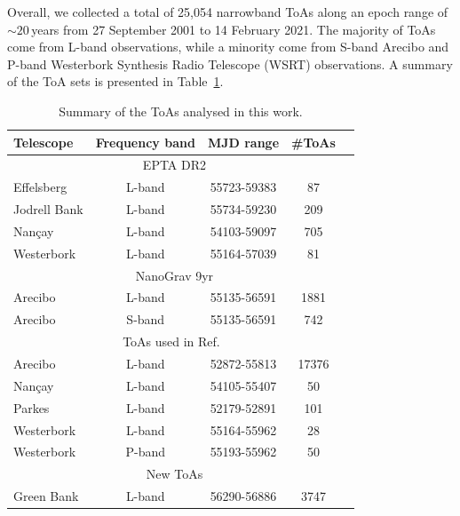 \documentclass[
    floats,
    floatfix,
    amssymb,
    prd,
    twocolumn,
    superscriptaddress,
    nofootinbib,
    unicode,
    colorlinks=true,
    linktocpage=true
]{revtex4-2}
\begin{document}
Overall, we collected a total of 25,054 narrowband ToAs along an epoch range of $\sim20$\,years from 27 September 2001 to 14 February 2021. The majority of ToAs come from L-band observations, while a minority come from S-band Arecibo and P-band Westerbork Synthesis Radio Telescope (WSRT) observations. A summary of the ToA sets is presented in Table~\ref{tab:toa-summary}.
%
\begin{table}[ht]
    \centering
    \begin{tabular}{lcccc}
    \hline
        \hline
        Telescope & Frequency band & MJD range & \#ToAs \\
        \hline
        \multicolumn{4}{c}{EPTA DR2} \\
        \hline
Effelsberg & L-band & 55723-59383 & 87 \\
Jodrell Bank & L-band & 55734-59230 &  209 \\
Nançay & L-band & 54103-59097 & 705 \\
Westerbork & L-band & 55164-57039 & 81 \\
        \hline
\multicolumn{4}{c}{NanoGrav 9yr}\\
        \hline
Arecibo & L-band & 55135-56591 & 1881 \\
Arecibo & S-band & 55135-56591 & 742 \\
        \hline
\multicolumn{4}{c}{ToAs used in Ref.~\cite{Freire:2012}}\\
        \hline
Arecibo &  L-band & 52872-55813 & 17376 \\
Nançay & L-band & 54105-55407 & 50 \\
Parkes & L-band & 52179-52891 & 101 \\ %
Westerbork & L-band & 55164-55962 & 28 \\
Westerbork & P-band &  55193-55962 & 50 \\
        \hline
\multicolumn{4}{c}{New ToAs}\\
        \hline
Green Bank & L-band & 56290-56886 & 3747 \\
        \hline
        \hline
\end{tabular}
    \caption{Summary of the ToAs analysed in this work.}
    \label{tab:toa-summary}
\end{table}
\end{document}
